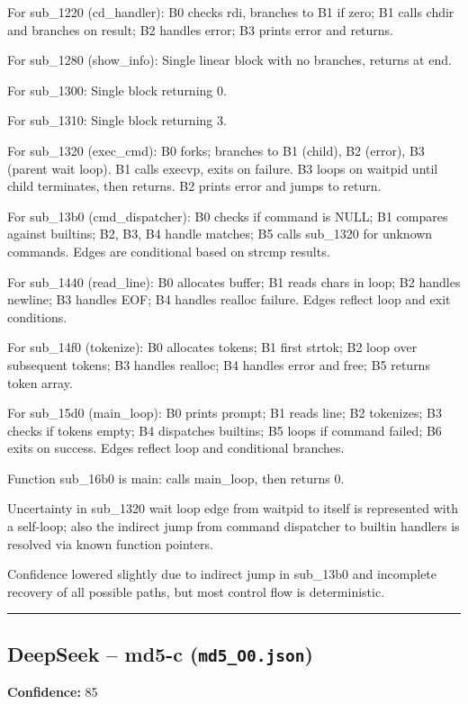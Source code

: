 For sub\_1220 (cd\_handler): B0 checks rdi, branches to B1 if zero; B1 calls chdir and branches on result; B2 handles error; B3 prints error and returns.

For sub\_1280 (show\_info): Single linear block with no branches, returns at end.

For sub\_1300: Single block returning 0.

For sub\_1310: Single block returning 3.

For sub\_1320 (exec\_cmd): B0 forks; branches to B1 (child), B2 (error), B3 (parent wait loop). B1 calls execvp, exits on failure. B3 loops on waitpid until child terminates, then returns. B2 prints error and jumps to return.

For sub\_13b0 (cmd\_dispatcher): B0 checks if command is NULL; B1 compares against builtins; B2, B3, B4 handle matches; B5 calls sub\_1320 for unknown commands. Edges are conditional based on strcmp results.

For sub\_1440 (read\_line): B0 allocates buffer; B1 reads chars in loop; B2 handles newline; B3 handles EOF; B4 handles realloc failure. Edges reflect loop and exit conditions.

For sub\_14f0 (tokenize): B0 allocates tokens; B1 first strtok; B2 loop over subsequent tokens; B3 handles realloc; B4 handles error and free; B5 returns token array.

For sub\_15d0 (main\_loop): B0 prints prompt; B1 reads line; B2 tokenizes; B3 checks if tokens empty; B4 dispatches builtins; B5 loops if command failed; B6 exits on success. Edges reflect loop and conditional branches.

Function sub\_16b0 is main: calls main\_loop, then returns 0.

Uncertainty in sub\_1320 wait loop edge from waitpid to itself is represented with a self-loop; also the indirect jump from command dispatcher to builtin handlers is resolved via known function pointers.

Confidence lowered slightly due to indirect jump in sub\_13b0 and incomplete recovery of all possible paths, but most control flow is deterministic.

\bigskip
\hrule
\bigskip

\subsection{DeepSeek -- md5-c (\texttt{md5\_O0.json})}

\textbf{Confidence:} 85


